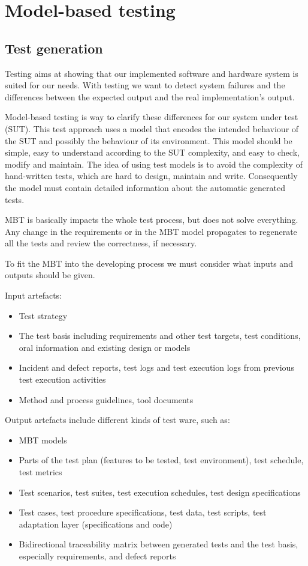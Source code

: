 \chapter{Model-based testing}
\section{Test generation}
Testing aims at showing that our implemented software and hardware system is suited for our needs. With testing we want to detect system failures and the differences between the expected output and the real implementation's output. 

Model-based testing is way to clarify these differences for our system under test (SUT). This test approach uses a model that encodes the intended behaviour of the SUT and possibly the behaviour of its environment. This model should be simple, easy to understand according to the SUT complexity, and easy to check, modify and maintain.
The idea of using test models is to avoid the complexity of hand-written tests, which are hard to design, maintain and write. Consequently the model must contain detailed information about the automatic generated tests. 

MBT is basically impacts the whole test process, but does not solve everything. Any change in the requirements or in the MBT model propagates to regenerate all the tests and review the correctness, if necessary.

To fit the MBT into the developing process we must consider what inputs and outputs should be given.

Input artefacts:
\begin{itemize}
	\item Test strategy
	\item  The test basis including requirements and other test targets, test conditions, oral information and 	existing design or models
	\item  Incident and defect reports, test logs and test execution logs from previous test execution activities
	\item  Method and process guidelines, tool documents
\end{itemize}

Output artefacts include different kinds of test ware, such as:
\begin{itemize}
	\item  MBT models
	\item  Parts of the test plan (features to be tested, test environment), test schedule, test metrics
	\item  Test scenarios, test suites, test execution schedules, test design specifications
	\item  Test cases, test procedure specifications, test data, test scripts, test adaptation layer (specifications and code)
	\item  Bidirectional traceability matrix between generated tests and the test basis, especially requirements, and defect reports
\end{itemize}

